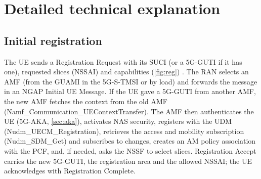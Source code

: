 \documentclass[11pt,a4paper]{article}
\begin{document}
\section{Detailed technical explanation}

\subsection{Initial registration}
The UE sends a Registration Request with its SUCI (or a 5G-GUTI if it has one), requested slices (NSSAI) and capabilities
(\cref{fig:reg}) \cite{ts23502}. The RAN selects an AMF (from the GUAMI in the 5G-S-TMSI or by load) and forwards the message in an NGAP
Initial UE Message. If the UE gave a 5G-GUTI from another AMF, the new AMF fetches the context from the old AMF
(Namf\_Communication\_UEContextTransfer). The AMF then authenticates the UE (5G-AKA, \cref{sec:aka}), activates NAS security, registers
with the UDM (Nudm\_UECM\_Registration), retrieves the access and mobility subscription (Nudm\_SDM\_Get) and subscribes to changes, creates
an AM policy association with the PCF, and, if needed, asks the NSSF to select slices. Registration Accept carries the new 5G-GUTI, the
registration area and the allowed NSSAI; the UE acknowledges with Registration Complete.

\begin{acnfigure}
  \caption{Initial registration with 5G-AKA (simplified) \cite{ts23502,ts33501}.}
  \label{fig:reg}
\end{acnfigure}
\end{document}
